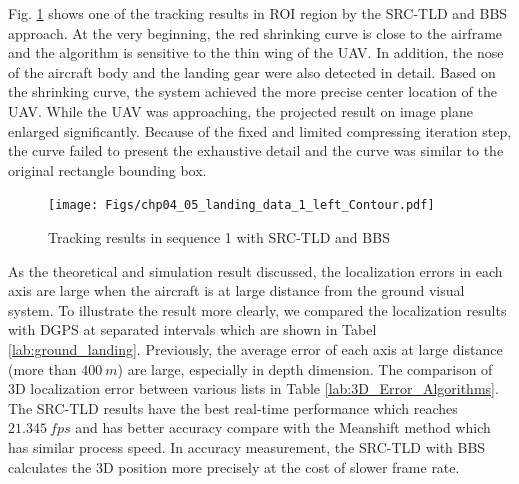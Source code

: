 Fig. \ref{fig:chp04_05_landing_data_1_left_Contour} shows one of the tracking results in ROI region by the SRC-TLD and BBS approach. At the very beginning, the red shrinking curve is close to the airframe and the algorithm is sensitive to the thin wing of the UAV. In addition, the nose of the aircraft body and the landing gear were also detected in detail. Based on the shrinking curve, the system achieved the more precise center location of the UAV. While the UAV was approaching, the projected result on image plane enlarged significantly. Because of the fixed and limited compressing iteration step, the curve failed to present the exhaustive detail and the curve was similar to the original rectangle bounding box.

\begin{figure}[!th]
	\centering
	\texttt{[image: Figs/chp04\_05\_landing\_data\_1\_left\_Contour.pdf]}
	\caption{Tracking results in sequence 1 with SRC-TLD and BBS}
	\label{fig:chp04_05_landing_data_1_left_Contour}    
\end{figure}
As the theoretical and simulation result discussed, the localization errors in each axis are large when the aircraft is at large distance from the ground visual system. To illustrate the result more clearly, we compared the localization results with DGPS at separated intervals which are shown in Tabel \ref{lab:ground_landing}. Previously, the average error of each axis at large distance (more than $400\ m$) are large, especially in depth dimension. The comparison of 3D localization error between various lists in Table \ref{lab:3D_Error_Algorithms}. The SRC-TLD results have the best real-time performance which reaches $21.345\ fps$ and has better accuracy compare with the Meanshift method which has similar process speed. In accuracy measurement, the SRC-TLD with BBS calculates the 3D position more precisely at the cost of slower frame rate.

